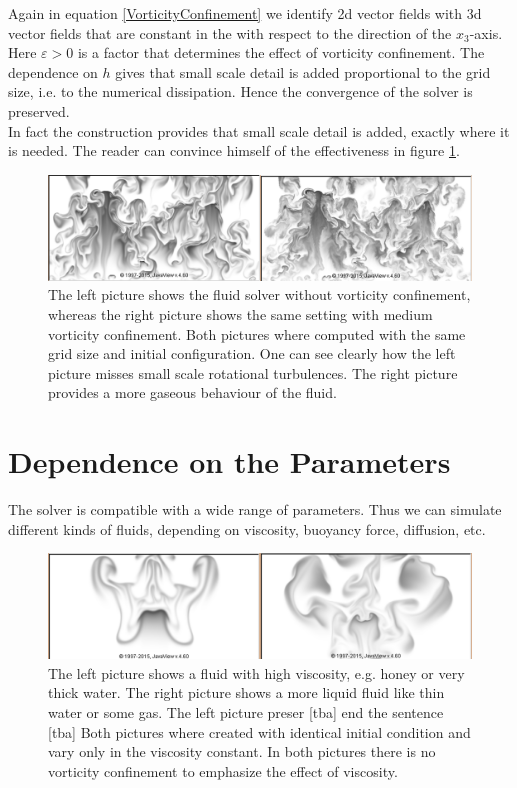 \documentclass[a4paper,10pt,oneside,final,german,openbib,pdftex,titlepage]{scrbook}
\begin{document}
Again in equation \ref{VorticityConfinement} we identify 2d vector fields with 3d vector fields that are constant in the with respect to the direction of the $x_3$-axis.
Here $\varepsilon >0$ is a factor that determines the effect of vorticity confinement. The dependence on $h$ gives that small scale detail is added proportional to the grid size, i.e. to the numerical dissipation. Hence the convergence of the solver is preserved.\\
In fact the construction provides that small scale detail is added, exactly where it is needed. The reader can convince himself of the effectiveness in figure \ref{VorticityOnOff}.

\begin{figure}[H]
 \centering
 \includegraphics[scale=0.30]{images/Vorticity.png}
 \caption{The left picture shows the fluid solver without vorticity confinement, whereas the right picture shows the same setting with medium vorticity confinement. Both pictures where computed with the same grid size and initial configuration. One can see clearly how the left picture misses small scale rotational turbulences. The right picture provides a more gaseous behaviour of the fluid.}
 \label{VorticityOnOff}
\end{figure}

\section{Dependence on the Parameters}
The solver is compatible with a wide range of parameters. Thus we can simulate different kinds of fluids, depending on viscosity, buoyancy force, diffusion, etc.

\begin{figure}[H]
 \centering
 \includegraphics[scale=0.30]{images/Viscosity-2.png}
 \caption{The left picture shows a fluid with high viscosity, e.g. honey or very thick water. The right picture shows a more liquid fluid like thin water or some gas. The left picture preser [tba] end the sentence [tba] Both pictures where created with identical initial condition and vary only in the viscosity constant. In both pictures there is no vorticity confinement to emphasize the effect of viscosity.}
 \label{ViscosityOnOff}
\end{figure}
\end{document}
